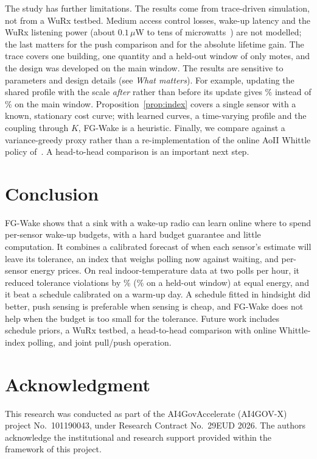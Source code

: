\documentclass[conference]{IEEEtran}
\begin{document}
The study has further limitations. The results come from trace-driven
simulation, not from a WuRx testbed. Medium access control losses, wake-up
latency and the WuRx listening power (about $0.1\,\mu$W to tens of
microwatts~\cite{piyare2017,magno2016})
are not modelled; the last matters for the push comparison and for the absolute
lifetime gain. The trace covers one building, one quantity and a held-out window
of only \HoMotes{} motes, and the design was developed on the main window. The
results are sensitive to parameters and design details (see \emph{What matters}).
For example, updating the shared profile with the scale \emph{after} rather than
before its update gives \SvTrPost\% instead of \SvTrPre\% on the main window.
Proposition~\ref{prop:index} covers a single sensor with a known, stationary cost
curve; with learned curves, a time-varying profile and the coupling through $K$,
FG-Wake is a heuristic. Finally, we compare against a variance-greedy proxy rather
than a re-implementation of the online AoII Whittle policy
of~\cite{jonah2026fair}. A head-to-head comparison is an important next step.

\section{Conclusion}
FG-Wake shows that a sink with a wake-up radio can learn online where to spend
per-sensor wake-up budgets, with a hard budget guarantee and little computation.
It combines a calibrated forecast of when each sensor's estimate will leave its
tolerance, an index that weighs polling now against waiting, and per-sensor
energy prices. On real indoor-temperature data at two polls per hour, it reduced
tolerance violations by \TrRed\% (\HoRed\% on a held-out window) at equal energy,
and it beat a schedule calibrated on a warm-up day. A schedule fitted in hindsight
did better, push sensing is preferable when sensing is cheap, and FG-Wake does
not help when the budget is too small for the tolerance. Future work includes
schedule priors, a WuRx testbed, a head-to-head comparison with online
Whittle-index polling, and joint pull/push operation.

\section*{Acknowledgment}
This research was conducted as part of the AI4GovAccelerate (AI4GOV-X) project
No.~101190043, under Research Contract No.~29EUD 2026. The authors acknowledge the
institutional and research support provided within the framework of this project.



\end{document}
